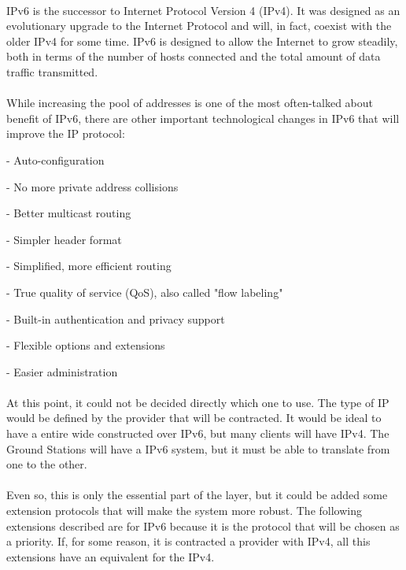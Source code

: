 \paragraph{}
IPv6 is the successor to Internet Protocol Version 4 (IPv4). It was designed as an evolutionary upgrade to the Internet Protocol and will, in fact, coexist with the older IPv4 for some time. IPv6 is designed to allow the Internet to grow steadily, both in terms of the number of hosts connected and the total amount of data traffic transmitted.
\paragraph{}
While increasing the pool of addresses is one of the most often-talked about benefit of IPv6, there are other important technological changes in IPv6 that will improve the IP protocol:
\begin{list}{}{}
\item - Auto-configuration
\item - No more private address collisions
\item - Better multicast routing
\item - Simpler header format
\item - Simplified, more efficient routing
\item - True quality of service (QoS), also called "flow labeling"
\item - Built-in authentication and privacy support
\item - Flexible options and extensions
\item - Easier administration 
\end{list}

\paragraph{}
At this point, it could not be decided directly which one to use. The type of IP would be defined by the provider that will be contracted. It would be ideal to have a entire wide constructed over IPv6, but many clients will have IPv4. The Ground Stations will have a IPv6 system, but it must be able to translate from one to the other.

\paragraph{}
Even so, this is only the essential part of the layer, but it could be added some extension protocols that will make the system more robust. The following extensions described are for IPv6 because it is the protocol that will be chosen as a priority. If, for some reason, it is contracted a provider with IPv4, all this extensions have an equivalent for the IPv4.

